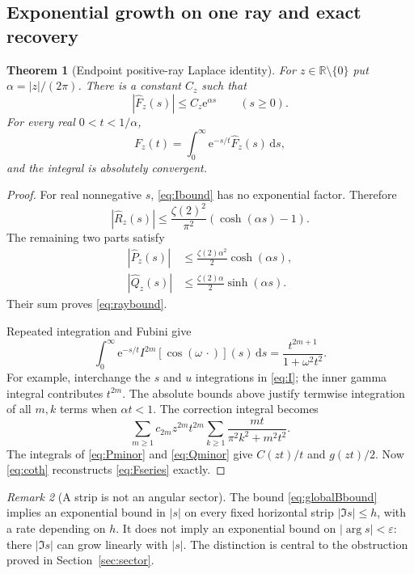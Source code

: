 \documentclass[11pt,a4paper]{article}
\numberwithin{equation}{section}
\newtheorem{theorem}{Theorem}[section]
\theoremstyle{definition}
\theoremstyle{remark}
\newtheorem{remark}[theorem]{Remark}
\newcommand{\R}{\mathbb R}
\newcommand{\e}{\mathrm e}
\newcommand{\dd}{\,\mathrm d}
\begin{document}
\subsection{Exponential growth on one ray and exact recovery}
\begin{theorem}[Endpoint positive-ray Laplace identity]
\label{thm:endpointlap}
For $z\in\R\setminus\{0\}$ put $\alpha=|z|/(2\pi)$. There is a constant $C_z$ such that
\begin{equation}
 |\widehat F_z(s)|\le C_z\e^{\alpha s}\qquad(s\ge0).
 \label{eq:raybound}
\end{equation}
For every real $0<t<1/\alpha$,
\begin{equation}
 F_z(t)=\int_0^\infty\e^{-s/t}\widehat F_z(s)\dd s,
 \label{eq:endpointlap}
\end{equation}
and the integral is absolutely convergent.
\end{theorem}
\begin{proof}
For real nonnegative $s$, \eqref{eq:Ibound} has no exponential factor. Therefore
\[
 |\widehat R_z(s)|\le\frac{\zeta(2)^2}{\pi^2}
                         (\cosh(\alpha s)-1).
\]
The remaining two parts satisfy
\begin{align*}
 |\widehat P_z(s)|&\le\frac{\zeta(2)\alpha^2}{2}\cosh(\alpha s),\\
 |\widehat Q_z(s)|&\le\frac{\zeta(2)\alpha}{2}\sinh(\alpha s).
\end{align*}
Their sum proves \eqref{eq:raybound}.

Repeated integration and Fubini give
\begin{equation}
 \int_0^\infty\e^{-s/t}I^{2m}[\cos(\omega\,\cdot)](s)\dd s
 =\frac{t^{2m+1}}{1+\omega^2t^2}.
 \label{eq:ILap}
\end{equation}
For example, interchange the $s$ and $u$ integrations in \eqref{eq:I}; the inner gamma integral contributes $t^{2m}$. The absolute bounds above justify termwise integration of all $m,k$ terms when $\alpha t<1$. The correction integral becomes
\[
 \sum_{m\ge1}c_{2m}z^{2m}t^{2m}
       \sum_{k\ge1}\frac{mt}{\pi^2k^2+m^2t^2}.
\]
The integrals of \eqref{eq:Pminor} and \eqref{eq:Qminor} give $C(zt)/t$ and $g(zt)/2$. Now \eqref{eq:coth} reconstructs \eqref{eq:Fseries} exactly.
\end{proof}

\begin{remark}[A strip is not an angular sector]
The bound \eqref{eq:globalBbound} implies an exponential bound in $|s|$ on every fixed horizontal strip $|\Im s|\le h$, with a rate depending on $h$. It does not imply an exponential bound on $|\arg s|<\varepsilon$: there $|\Im s|$ can grow linearly with $|s|$. The distinction is central to the obstruction proved in Section~\ref{sec:sector}.
\end{remark}
\end{document}
